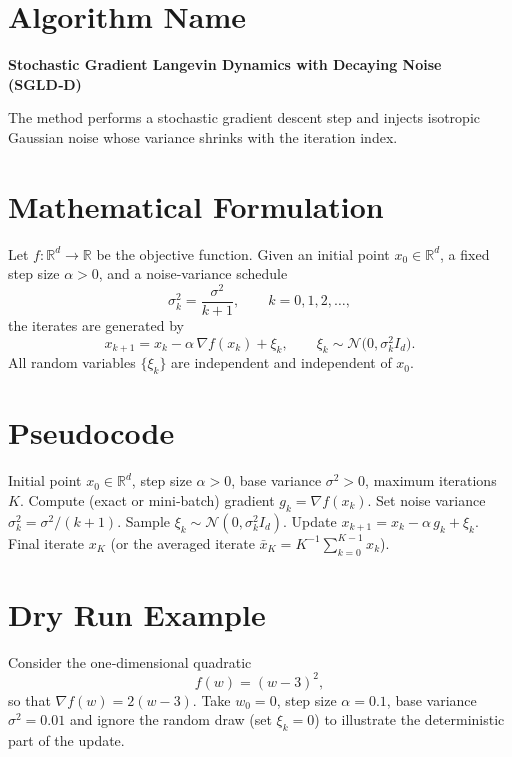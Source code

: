 \documentclass{article}
\newcommand{\R}{\mathbb{R}}
\begin{document}
\section*{Algorithm Name}
\textbf{Stochastic Gradient Langevin Dynamics with Decaying Noise (SGLD‑D)}  

The method performs a stochastic gradient descent step and injects isotropic Gaussian noise whose variance shrinks with the iteration index.

\section*{Mathematical Formulation}
Let $f:\R^{d}\rightarrow\R$ be the objective function.  
Given an initial point $x_{0}\in\R^{d}$, a fixed step size $\alpha>0$, and a noise‑variance schedule 
\[
\sigma_{k}^{2}= \frac{\sigma^{2}}{k+1},\qquad k=0,1,2,\dots ,
\]
the iterates are generated by
\begin{equation}
\boxed{
x_{k+1}=x_{k}-\alpha\,\nabla f(x_{k})+\xi_{k}},\qquad 
\xi_{k}\sim\mathcal N\!\bigl(0,\sigma_{k}^{2}I_{d}\bigr). \label{eq:update}
\end{equation}
All random variables $\{\xi_{k}\}$ are independent and independent of $x_{0}$.

\section*{Pseudocode}
\begin{algorithm}[H]
\caption{SGLD‑D}
\begin{algorithmic}[1]
\REQUIRE Initial point $x_{0}\in\R^{d}$, step size $\alpha>0$, base variance $\sigma^{2}>0$, maximum iterations $K$.
    \STATE Compute (exact or mini‑batch) gradient $g_{k}= \nabla f(x_{k})$.
    \STATE Set noise variance $\sigma_{k}^{2}= \sigma^{2}/(k+1)$.
    \STATE Sample $\xi_{k}\sim\mathcal N(0,\sigma_{k}^{2}I_{d})$.
    \STATE Update $x_{k+1}=x_{k}-\alpha\, g_{k}+ \xi_{k}$.
\ENDFOR
\ENSURE Final iterate $x_{K}$ (or the averaged iterate $\bar x_{K}=K^{-1}\sum_{k=0}^{K-1}x_{k}$).
\end{algorithmic}
\end{algorithm}

\section*{Dry Run Example}
Consider the one‑dimensional quadratic
\[
f(w)=(w-3)^{2},
\]
so that $\nabla f(w)=2(w-3)$.  
Take $w_{0}=0$, step size $\alpha=0.1$, base variance $\sigma^{2}=0.01$ and ignore the random draw (set $\xi_{k}=0$) to illustrate the deterministic part of the update.
\end{document}

